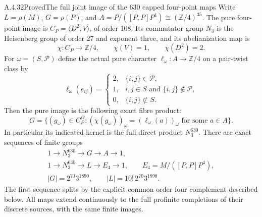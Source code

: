 \begin{result}{A.4.32}{Proved}{The full joint image of the 630 capped four-point maps}
Write $L=\rho(M)$, $G=\rho(P)$, and
$A=P/([P,P]P^4)\cong(\mathbb Z/4)^{35}$.
The pure four-point image is
$C_P=\langle D^2,V\rangle$, of order 108.
Its commutator group $N_3$ is the Heisenberg group of order 27
and exponent three, and its abelianization map is
\[
 \chi:C_P\longrightarrow\mathbb Z/4,
 \qquad \chi(V)=1,\qquad\chi(D^2)=2.                      \tag{JQT.2}
\]
For $\omega=(S,\mathcal P)$ define the actual pure character
$\ell_\omega:A\to\mathbb Z/4$ on a pair-twist class by
\[
 \ell_\omega(e_{ij})=
 \begin{cases}
  2,&\{i,j\}\in\mathcal P,\\
  1,&i,j\in S\text{ and }\{i,j\}\notin\mathcal P,\\
  0,&\{i,j\}\not\subset S.
 \end{cases}                                              \tag{JQT.3}
\]
Then the pure image is the following exact fibre product:
\[
 G=\{(g_\omega)\in C_P^\Omega:
         (\chi(g_\omega))_\omega
          =(\ell_\omega(a))_\omega\text{ for some }a\in A\}.
                                                               \tag{JQT.4}
\]
In particular its indicated kernel is the full direct product
$N_3^{630}$.  There are exact sequences of finite groups
\[
\begin{gathered}
 1\longrightarrow N_3^{630}\longrightarrow G
      \longrightarrow A\longrightarrow1,\\
 1\longrightarrow N_3^{630}\longrightarrow L
      \longrightarrow E_4\longrightarrow1,
 \qquad E_4=M/([P,P]P^4),\\
 |G|=2^{70}3^{1890},\qquad
 |L|=10!\,2^{70}3^{1890}.
\end{gathered}                                                  \tag{JQT.5}
\]
The first sequence splits by the explicit common order-four
complement described below.  All maps extend continuously to
the full profinite completions of their discrete sources,
with the same finite images.
\end{result}

